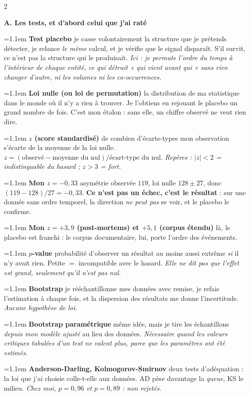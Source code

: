 \documentclass[9pt,a4paper]{article}
\newcommand{\n}[1]{\textbf{#1}}
\newcommand{\dfn}[2]{\noindent\hangindent=1.1em\hangafter=1
  {\color{warm}\bfseries #1} \textemdash{} #2\par\smallskip}
\begin{document}
\vspace{2pt}
\begin{multicols}{2}
\scriptsize

{\color{navy}\bfseries A. Les tests, et d'abord celui que j'ai raté}

\dfn{Test placebo}{je casse volontairement la structure que je prétends détecter, je relance
\emph{le même} calcul, et je vérifie que le signal disparaît. S'il survit, ce n'est pas la
structure qui le produisait. \emph{Ici : je permute l'ordre du temps à l'intérieur de chaque
entité, ce qui détruit « qui vient avant qui » sans rien changer d'autre, ni les volumes ni
les co-occurrences.}}

\dfn{Loi nulle (ou loi de permutation)}{la distribution de ma statistique dans le monde où il
n'y a rien à trouver. Je l'obtiens en rejouant le placebo un grand nombre de fois. C'est mon
étalon : sans elle, un chiffre observé ne veut rien dire.}

\dfn{$z$ (score standardisé)}{de combien d'écarts-types mon observation s'écarte de la
moyenne de la loi nulle. $z=(\text{observé}-\text{moyenne du nul})/\text{écart-type du nul}$.
\emph{Repères : $|z|<2$ = indistinguable du hasard ; $z>3$ = fort.}}

\dfn{Mon $z=-0{,}33$}{asymétrie observée $119$, loi nulle $128\pm27$, donc
$(119-128)/27=-0{,}33$. \n{Ce n'est pas un échec, c'est le résultat} : sur une donnée sans
ordre temporel, la direction \emph{ne peut pas} se voir, et le placebo le confirme.}

\dfn{Mon $z=+3{,}9$ (post-mortems) et $+5{,}1$ (corpus étendu)}{là, le placebo est franchi :
le corpus documentaire, lui, porte l'ordre des événements.}

\dfn{$p$-value}{probabilité d'observer un résultat au moins aussi extrême \emph{si} il n'y
avait rien. Petite $=$ incompatible avec le hasard. \emph{Elle ne dit pas que l'effet est
grand, seulement qu'il n'est pas nul.}}

\dfn{Bootstrap}{je rééchantillonne mes données avec remise, je refais l'estimation à chaque
fois, et la dispersion des résultats me donne l'incertitude. \emph{Aucune hypothèse de loi.}}

\dfn{Bootstrap paramétrique}{même idée, mais je tire les échantillons \emph{depuis mon modèle
ajusté} au lieu des données. \emph{Nécessaire quand les valeurs critiques tabulées d'un test
ne valent plus, parce que les paramètres ont été estimés.}}

\dfn{Anderson-Darling, Kolmogorov-Smirnov}{deux tests d'adéquation : la loi que j'ai choisie
colle-t-elle aux données. AD pèse davantage la \emph{queue}, KS le milieu. \emph{Chez moi,
$p=0{,}96$ et $p=0{,}89$ : non rejetés.}}


\end{multicols}
\end{document}
